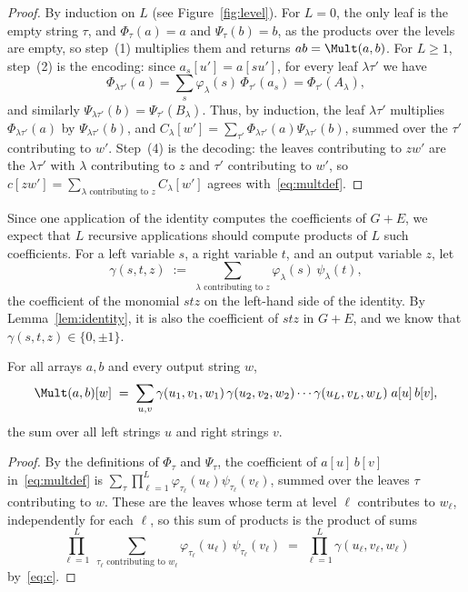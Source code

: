 \begin{proof}
By induction on $L$ (see Figure~\ref{fig:level}). For $L=0$, the only leaf is the empty string $\tau$, and $\Phi_\tau(a)=a$ and $\Psi_\tau(b)=b$, as the products over the levels are empty, so step~(1) multiplies them and returns $ab=\Mult(a,b)$. For $L\ge1$, step~(2) is the encoding: since $a_s[u']=a[su']$, for every leaf $\lambda\tau'$ we have
\[
\Phi_{\lambda\tau'}(a)=\sum_s\varphi_\lambda(s)\,\Phi_{\tau'}(a_s)=\Phi_{\tau'}(A_\lambda),
\]
and similarly $\Psi_{\lambda\tau'}(b)=\Psi_{\tau'}(B_\lambda)$. Thus, by induction, the leaf $\lambda\tau'$ multiplies $\Phi_{\lambda\tau'}(a)$ by $\Psi_{\lambda\tau'}(b)$, and $C_\lambda[w']=\sum_{\tau'}\Phi_{\lambda\tau'}(a)\Psi_{\lambda\tau'}(b)$, summed over the $\tau'$ contributing to $w'$. Step~(4) is the decoding: the leaves contributing to $zw'$ are the $\lambda\tau'$ with $\lambda$ contributing to $z$ and $\tau'$ contributing to $w'$, so $c[zw']=\sum_{\lambda\text{ contributing to }z}C_\lambda[w']$ agrees with~\eqref{eq:multdef}.
\end{proof}

Since one application of the identity computes the coefficients of $G+E$, we expect that $L$ recursive applications should compute products of $L$ such coefficients. For a left variable $s$, a right variable $t$, and an output variable $z$, let
\begin{equation}\label{eq:c}
\gamma(s,t,z)\;:=\;\sum_{\lambda\text{ contributing to }z}\varphi_\lambda(s)\,\psi_\lambda(t),
\end{equation}
the coefficient of the monomial $stz$ on the left-hand side of the identity. By Lemma~\ref{lem:identity}, it is also the coefficient of $stz$ in $G+E$, and we know that $\gamma(s,t,z)\in\{0,\pm1\}$.

\begin{lemma}\label{lem:mult}
For all arrays $a,b$ and every output string $w$,
\[
\Mult(a,b)[w]\;=\;\sum_{u,v}\gamma(u_1,v_1,w_1)\,\gamma(u_2,v_2,w_2)\cdots\gamma(u_L,v_L,w_L)\;a[u]\,b[v],
\]
the sum over all left strings $u$ and right strings $v$.
\end{lemma}

\begin{proof}
By the definitions of $\Phi_\tau$ and $\Psi_\tau$, the coefficient of $a[u]\,b[v]$ in~\eqref{eq:multdef} is $\sum_\tau\prod_{\ell=1}^{L}\varphi_{\tau_\ell}(u_\ell)\psi_{\tau_\ell}(v_\ell)$, summed over the leaves $\tau$ contributing to $w$. These are the leaves whose term at level $\ell$ contributes to $w_\ell$, independently for each $\ell$, so this sum of products is the product of sums
\[
\prod_{\ell=1}^{L}\ \sum_{\tau_\ell\text{ contributing to }w_\ell}\varphi_{\tau_\ell}(u_\ell)\,\psi_{\tau_\ell}(v_\ell)\;=\;\prod_{\ell=1}^{L}\gamma(u_\ell,v_\ell,w_\ell)
\]
by~\eqref{eq:c}.
\end{proof}

